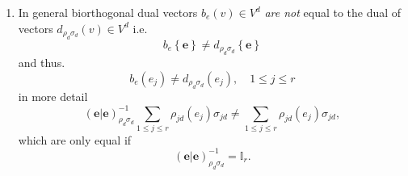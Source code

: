 \documentclass[aps,preprint]{revtex4}
\begin{document}
\begin{enumerate}
\begin{enumerate}
\begin{gather}
\begin{array}{ccc}
\vdots & \ddots & \vdots \\ 
\left( \left. e_{r}\right\vert e_{1}\right) _{\rho _{d}\sigma _{d}} & \cdots
& \left( \left. e_{r}\right\vert e_{r}\right) _{\rho _{d}\sigma _{d}}%
\end{array}%
\right) ^{\boldsymbol{-}1}\left( 
\begin{array}{c}
\left( \left. e_{1}\right\vert v\right) _{\rho _{d}\sigma _{d}} \\ 
\vdots \\ 
\left( \left. e_{r}\right\vert v\right) _{\rho _{d}\sigma _{d}}%
\end{array}%
\right) =\left( 
\begin{array}{c}
\left( \left. \mathfrak{b}_{\rho _{d}\sigma _{d}}\left( e_{1}\right)
\right\vert v\right) _{\rho _{d}\sigma _{d}} \\ 
\vdots \\ 
\left( \left. \mathfrak{b}_{\rho _{d}\sigma _{d}}\left( e_{1}\right)
\right\vert v\right) _{\rho _{d}\sigma _{d}}%
\end{array}%
\right) \\
\parallel \\
\mathcal{R}_{e}\left( v\right) =\mathcal{R}_{e}\left( S_{\rho _{d}\sigma
_{d}ee}\right) ^{-1}\left( \left. \boldsymbol{e}\right\vert v\right) _{\rho
_{d}\sigma _{d}},
\end{gather}%
where the biorthogonalizing operator $\mathfrak{b}_{\rho _{d}\sigma _{d}}\in 
\mathcal{L}\left( V\right) $ is defined by 
\begin{equation}
\left( \left. \mathfrak{b}_{\rho _{d}\sigma _{d}}\left( \boldsymbol{e}%
\right) \right\vert \boldsymbol{e}\right) _{\rho _{d}\sigma _{d}}=\left[
b_{e}\left( \boldsymbol{e}\right) \right] \left( \boldsymbol{e}\right) =%
\mathbb{I}_{r}.
\end{equation}

\item In general biorthogonal dual vectors $b_{e}\left( v\right) \in V^{d}$ 
\emph{are not} equal to the dual of vectors $d_{\rho _{d}\sigma _{d}}\left(
v\right) \in V^{d}$ i.e. 
\begin{equation}
b_{e}\left\{ \boldsymbol{e}\right\} \neq d_{\rho _{d}\sigma _{d}}\left\{ 
\boldsymbol{e}\right\}
\end{equation}%
and thus. 
\begin{equation}
b_{e}\left( e_{j}\right) \neq d_{\rho _{d}\sigma _{d}}\left( e_{j}\right)
,\quad 1\leq j\leq r
\end{equation}%
in more detail 
\begin{equation}
\left( \left. \boldsymbol{e}\right\vert \boldsymbol{e}\right) _{\rho
_{d}\sigma _{d}}^{-1}\sum_{1\leq j\leq r}\rho _{jd}\left( e_{j}\right)
\sigma _{jd}\neq \sum_{1\leq j\leq r}\rho _{jd}\left( e_{j}\right) \sigma
_{jd},
\end{equation}%
which are only equal if 
\begin{equation}
\left( \left. \boldsymbol{e}\right\vert \boldsymbol{e}\right) _{\rho
_{d}\sigma _{d}}^{-1}=\mathbb{I}_{r}.
\end{equation}
\end{enumerate}


\end{enumerate}
\end{document}
